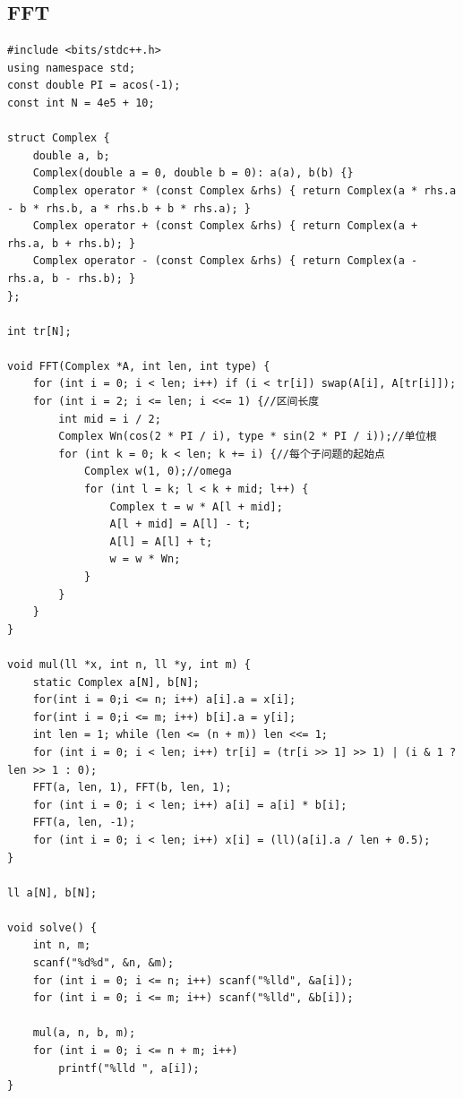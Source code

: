 \documentclass[twoside]{article}
\begin{document}
\subsection{FFT}
\begin{lstlisting}
#include <bits/stdc++.h>
using namespace std;
const double PI = acos(-1);
const int N = 4e5 + 10;

struct Complex {
    double a, b;
    Complex(double a = 0, double b = 0): a(a), b(b) {}
    Complex operator * (const Complex &rhs) { return Complex(a * rhs.a - b * rhs.b, a * rhs.b + b * rhs.a); }
    Complex operator + (const Complex &rhs) { return Complex(a + rhs.a, b + rhs.b); }
    Complex operator - (const Complex &rhs) { return Complex(a - rhs.a, b - rhs.b); }
};

int tr[N];

void FFT(Complex *A, int len, int type) {
    for (int i = 0; i < len; i++) if (i < tr[i]) swap(A[i], A[tr[i]]);
    for (int i = 2; i <= len; i <<= 1) {//区间长度
        int mid = i / 2;
        Complex Wn(cos(2 * PI / i), type * sin(2 * PI / i));//单位根
        for (int k = 0; k < len; k += i) {//每个子问题的起始点
            Complex w(1, 0);//omega
            for (int l = k; l < k + mid; l++) {
                Complex t = w * A[l + mid];
                A[l + mid] = A[l] - t;
                A[l] = A[l] + t;
                w = w * Wn;
            }
        }
    }
}

void mul(ll *x, int n, ll *y, int m) {
    static Complex a[N], b[N];
    for(int i = 0;i <= n; i++) a[i].a = x[i];
    for(int i = 0;i <= m; i++) b[i].a = y[i];
    int len = 1; while (len <= (n + m)) len <<= 1;
    for (int i = 0; i < len; i++) tr[i] = (tr[i >> 1] >> 1) | (i & 1 ? len >> 1 : 0);
    FFT(a, len, 1), FFT(b, len, 1);
    for (int i = 0; i < len; i++) a[i] = a[i] * b[i];
    FFT(a, len, -1);
    for (int i = 0; i < len; i++) x[i] = (ll)(a[i].a / len + 0.5);
}

ll a[N], b[N];

void solve() {
    int n, m;
    scanf("%d%d", &n, &m);
    for (int i = 0; i <= n; i++) scanf("%lld", &a[i]);
    for (int i = 0; i <= m; i++) scanf("%lld", &b[i]);

    mul(a, n, b, m);
    for (int i = 0; i <= n + m; i++)
        printf("%lld ", a[i]);
}\end{lstlisting}
\end{document}
